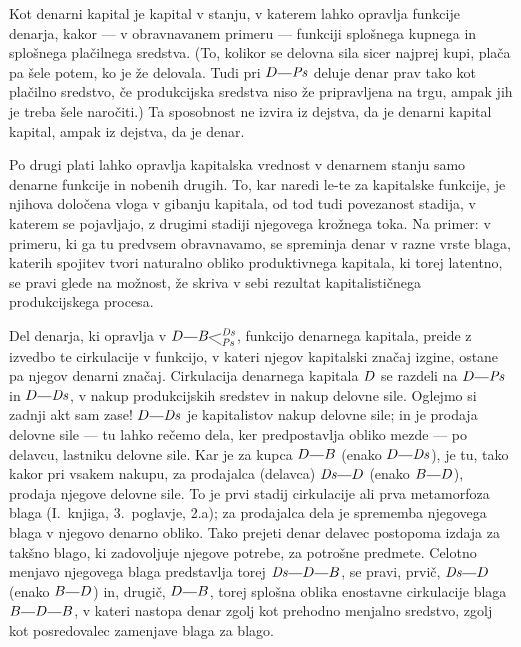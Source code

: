 \documentclass[kapital_02.tex]{subfiles}
\begin{document}
Kot denarni kapital je kapital v stanju, v katerem lahko opravlja funkcije denarja, kakor --- v obravnavanem primeru --- funkciji splošnega kupnega in splošnega plačilnega sredstva. (To, kolikor se delovna sila sicer najprej kupi, plača pa šele potem, ko je že delovala. Tudi pri \(\KPED\KPEcrta\KPEPs\) deluje denar prav tako kot plačilno sredstvo, če produkcijska sredstva niso že pripravljena na trgu, ampak jih je treba šele naročiti.) Ta sposobnost ne izvira iz dejstva, da je denarni kapital kapital, ampak iz dejstva, da je denar.

Po drugi plati lahko opravlja kapitalska vrednost v denarnem stanju samo denarne funkcije in nobenih drugih. To, kar naredi le-te za kapitalske funkcije, je njihova določena vloga v gibanju kapitala, od tod tudi povezanost stadija, v katerem se pojavljajo, z drugimi stadiji njegovega krožnega toka. Na primer: v primeru, ki ga tu predvsem obravnavamo, se spreminja denar v razne vrste blaga, katerih spojitev tvori naturalno obliko produktivnega kapitala, ki torej latentno, se pravi glede na možnost, že skriva v sebi rezultat kapitalističnega produkcijskega procesa.

Del denarja, ki opravlja v \(\KPED\KPEcrta\KPEBrazcepDsPs\), funkcijo denarnega kapitala, preide z izvedbo te cirkulacije v funkcijo, v kateri njegov kapitalski značaj izgine, ostane pa njegov denarni značaj. Cirkulacija denarnega kapitala \(D\) se razdeli na \(\KPED\KPEcrta\KPEPs\) in \(\KPED\KPEcrta\KPEDs\), v nakup produkcijskih sredstev in nakup delovne sile. Oglejmo si zadnji akt sam zase! \(\KPED\KPEcrta\KPEDs\) je kapitalistov nakup delovne sile; in je prodaja delovne sile --- tu lahko rečemo dela, ker predpostavlja obliko mezde --- po delavcu, lastniku delovne sile. Kar je za kupca \(\KPED\KPEcrta\KPEB\) (enako \(\KPED\KPEcrta\KPEDs\)), je tu, tako kakor pri vsakem nakupu, za prodajalca (delavca) \(\KPEDs\KPEcrta\KPED\) (enako \(\KPEB\KPEcrta\KPED\)), prodaja njegove delovne sile. To je prvi stadij cirkulacije ali prva metamorfoza blaga (I.~knjiga, 3.~poglavje, 2.a); za prodajalca dela je sprememba njegovega blaga v njegovo denarno obliko. Tako prejeti denar delavec postopoma izdaja za takšno blago, ki zadovoljuje njegove potrebe, za potrošne predmete. Celotno menjavo njegovega blaga predstavlja torej \(\KPEDs\KPEcrta\KPED\KPEcrta\KPEB\), se pravi, prvič, \(\KPEDs\KPEcrta\KPED\) (enako \(\KPEB\KPEcrta\KPED\)) in, drugič, \(\KPED\KPEcrta\KPEB\), torej splošna oblika enostavne cirkulacije blaga \(\KPEB\KPEcrta\KPED\KPEcrta\KPEB\), v kateri nastopa denar zgolj kot prehodno menjalno sredstvo, zgolj kot posredovalec zamenjave blaga za blago.
\end{document}
